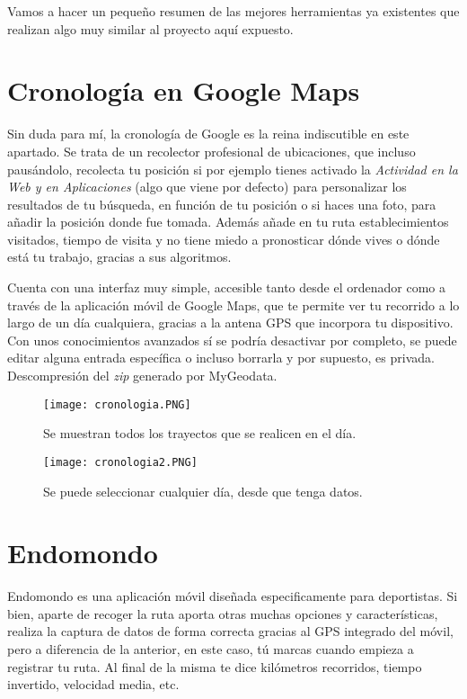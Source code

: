 
Vamos a hacer un pequeño resumen de las mejores herramientas ya existentes que realizan algo muy similar al proyecto aquí expuesto.

\section{Cronología en Google Maps}
Sin duda para mí, la cronología de Google \cite{cronologia} es la reina indiscutible en este apartado. Se trata de un recolector profesional de ubicaciones, que incluso pausándolo, recolecta tu posición si por ejemplo tienes activado la \textit{Actividad en la Web y en Aplicaciones} (algo que viene por defecto) para personalizar los resultados de tu búsqueda, en función de tu posición o si haces una foto, para añadir la posición donde fue tomada.
Además añade en tu ruta establecimientos visitados, tiempo de visita y no tiene miedo a pronosticar dónde vives o dónde está tu trabajo, gracias a sus algoritmos.

Cuenta con una interfaz muy simple, accesible tanto desde el ordenador como a través de la aplicación móvil de Google Maps, que te permite ver tu recorrido a lo largo de un día cualquiera, gracias a la antena GPS que incorpora tu dispositivo.
Con unos conocimientos avanzados sí se podría desactivar por completo, se puede editar alguna entrada específica o incluso borrarla y por supuesto, es privada.
Descompresión del \textit{zip} generado por MyGeodata.
\begin{figure}[!h]
	\centering
	\texttt{[image: cronologia.PNG]}
	\caption{Se muestran todos los trayectos que se realicen en el día.}\label{fig:cronologia.PNG}
\end{figure}
\FloatBarrier
\begin{figure}[!h]
	\centering
	\texttt{[image: cronologia2.PNG]}
	\caption{Se puede seleccionar cualquier día, desde que tenga datos.}\label{fig:cronologia2.PNG}
\end{figure}
\FloatBarrier

\section{Endomondo}
Endomondo \cite{endomondo} es una aplicación móvil diseñada especificamente para deportistas. Si bien, aparte de recoger la ruta aporta otras muchas opciones y características, realiza la captura de datos de forma correcta gracias al GPS integrado del móvil, pero a diferencia de la anterior, en este caso, tú marcas cuando empieza a registrar tu ruta. Al final de la misma te dice kilómetros recorridos, tiempo invertido, velocidad media, etc.

